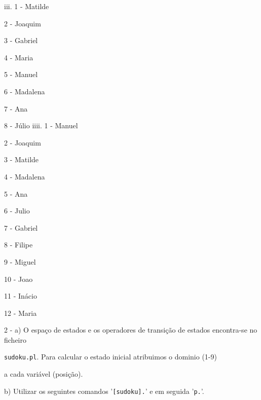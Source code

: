 \documentclass[11pt]{article}
\begin{document}
\hspace{1cm}iii. 1 - Matilde

\hspace{1,6cm}2 - Joaquim

\hspace{1,6cm}3 - Gabriel

\hspace{1,6cm}4 - Maria

\hspace{1,6cm}5 - Manuel

\hspace{1,6cm}6 - Madalena

\hspace{1,6cm}7 - Ana

\hspace{1,6cm}8 - Júlio
\newpage
\hspace{1cm}iiii. 1 - Manuel

\hspace{1,7cm}2 - Joaquim

\hspace{1,7cm}3 - Matilde

\hspace{1,7cm}4 - Madalena

\hspace{1,7cm}5 - Ana

\hspace{1,7cm}6 - Julio

\hspace{1,7cm}7 - Gabriel

\hspace{1,7cm}8 - Filipe

\hspace{1,7cm}9 - Miguel

\hspace{1,7cm}10 - Joao

\hspace{1,7cm}11 - Inácio

\hspace{1,7cm}12 - Maria
\newline

2 - a) O espaço de estados e os operadores de transição de estados encontra-se no ficheiro

\hspace{1,1cm}\verb|sudoku.pl|. Para calcular o estado inicial atribuimos o dominio (1-9)

\hspace{1,1cm}a cada variável (posição).

\hspace{0,6cm}b) Utilizar os seguintes comandos '\verb|[sudoku].|' e em seguida 
'\verb|p.|'.
\end{document}
